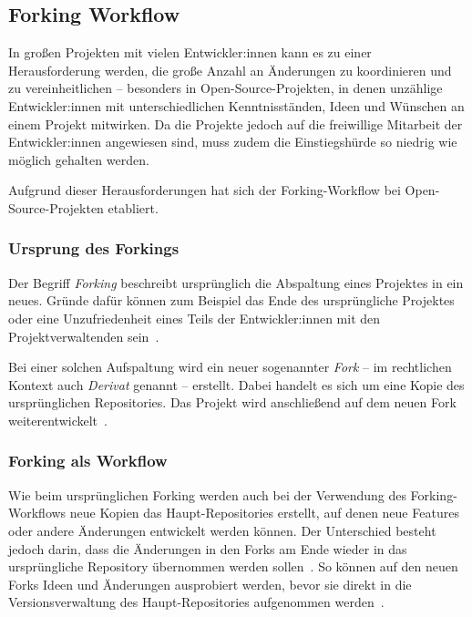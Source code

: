 
\subsection{Forking Workflow}
\label{sec:workflows:forking}

In großen Projekten mit vielen Entwickler:innen kann es zu einer Herausforderung werden, die große Anzahl an Änderungen zu koordinieren und zu vereinheitlichen -- besonders in Open\hyp Source\hyp Projekten, in denen unzählige Entwickler:innen mit unterschiedlichen Kenntnisständen, Ideen und Wünschen an einem Projekt mitwirken. Da die Projekte jedoch auf die freiwillige Mitarbeit der Entwickler:innen angewiesen sind, muss zudem die Einstiegshürde so niedrig wie möglich gehalten werden.

Aufgrund dieser Herausforderungen hat sich der Forking\hyp Workflow bei Open\hyp Source\hyp Projekten etabliert.


\subsubsection{Ursprung des Forkings}

Der Begriff \emph{Forking} beschreibt ursprünglich die Abspaltung eines Projektes in ein neues. Gründe dafür können zum Beispiel das Ende des ursprüngliche Projektes oder eine Unzufriedenheit eines Teils der Entwickler:innen mit den Projektverwaltenden sein~\cite{whyDoOpenSourceProjectsFork?}.

Bei einer solchen Aufspaltung wird ein neuer sogenannter \emph{Fork} -- im rechtlichen Kontext auch \emph{Derivat} genannt -- erstellt. Dabei handelt es sich um eine Kopie des ursprünglichen Repositories. Das Projekt wird anschließend auf dem neuen Fork weiterentwickelt~\cite{devInsiderWasIstEinFork?}.


\subsubsection{Forking als Workflow}

Wie beim ursprünglichen Forking werden auch bei der Verwendung des Forking\hyp Workflows neue Kopien das Haupt\hyp Repositories erstellt, auf denen neue Features oder andere Änderungen entwickelt werden können. Der Unterschied besteht jedoch darin, dass die Änderungen in den Forks am Ende wieder in das ursprüngliche Repository übernommen werden sollen~\cite{gitHubInformationenZuForks}. So können auf den neuen Forks Ideen und Änderungen ausprobiert werden, bevor sie direkt in die Versionsverwaltung des Haupt\hyp Repositories aufgenommen werden~\cite{gitHubInformationenZuForks}.

